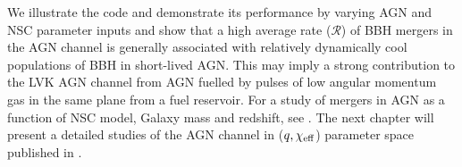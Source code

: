 We illustrate the code and demonstrate its performance by varying AGN and NSC parameter inputs and show that a high average rate ($\mathcal{R}$) of BBH mergers in the AGN channel is generally associated with relatively dynamically cool populations of BBH in short-lived AGN.
This may imply a strong contribution to the LVK AGN channel from AGN fuelled by pulses of low angular momentum gas in the same plane from a fuel reservoir.
For a study of mergers in AGN as a function of NSC model, Galaxy mass and redshift, see \citep{Delfavero+25}.
The next chapter will present a detailed studies of the AGN channel in ($q,\chi_{\rm eff}$) parameter space published in \citet{Cook+25}.

